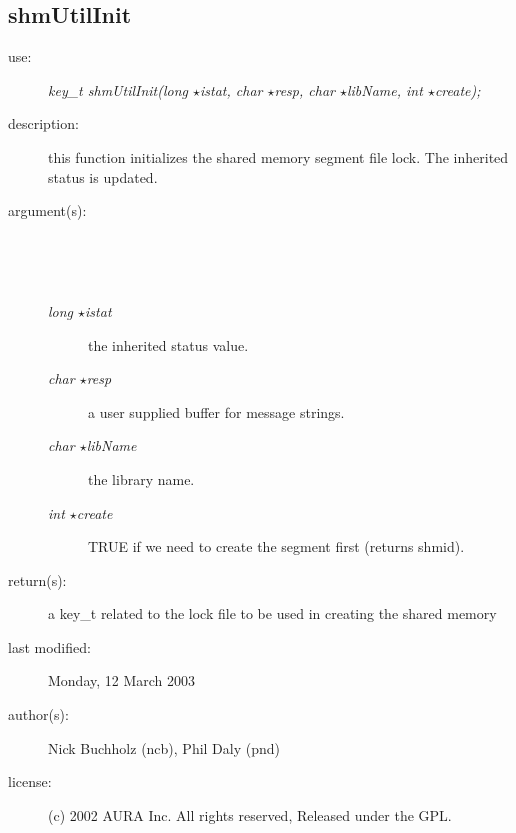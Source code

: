 \subsection {shmUtilInit} \begin{description} \item[\sc use:] \emph{key\_t shmUtilInit(long $\star$istat, char $\star$resp, char $\star$libName, int $\star$create);} \item[\sc description:] this function initializes the shared memory segment file lock. The inherited status is updated. \item[\sc argument(s):] \begin{description} \item[\ ] \ \item[\emph{long $\star$istat}] the inherited status value. \item[\emph{char $\star$resp}] a user supplied buffer for message strings. \item[\emph{char $\star$libName}] the library name. \item[\emph{int $\star$create}] TRUE if we need to create the segment first (returns shmid). \end{description} \item[\sc return(s):] a key\_t related to the lock file to be used in creating the shared memory \item[\sc last modified:] Monday, 12 March 2003 \item[\sc author(s):] Nick Buchholz (ncb), Phil Daly (pnd) \item[\sc license:] (c) 2002 AURA Inc. All rights reserved, Released under the GPL. \end{description}
